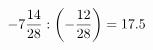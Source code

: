 \documentclass[preview]{standalone}
\begin{document}
\begin{align*}
-7 { 14 \over 28 }  :  \left( - { 12 \over 28 } \right) = 17.5
\end{align*}
\end{document}
